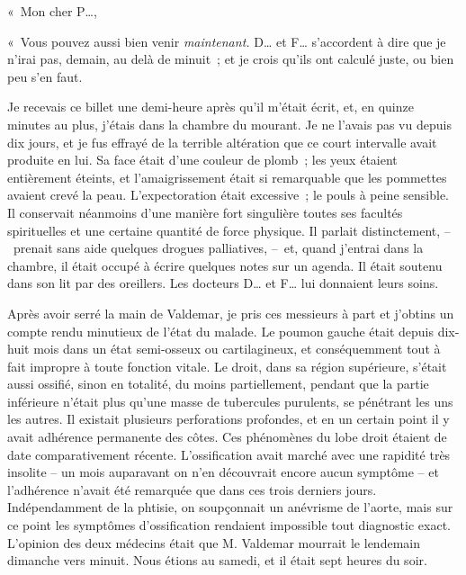 \documentclass[french,twoside]{book} %
\newcommand{\signed}[1]{\bigbreak\filbreak{\raggedleft #1\par}\medskip}
\newenvironment{quoteblock}%
  {\begin{quoting}}
  {\end{quoting}}
\newenvironment{quotebar}{%
    \def\FrameCommand{{\color{rubric!10!}\vrule width 0.5em} \hspace{0.9em}}%
    \def\OuterFrameSep{\itemsep} %
    \MakeFramed {\advance\hsize-\width \FrameRestore}
  }%
  {%
    \endMakeFramed
  }
\renewenvironment{quoteblock}%
  {%
    \savenotes
    \setstretch{0.9}
    \normalfont
    \begin{quotebar}
  }
  {%
    \end{quotebar}
    \spewnotes
  }
\begin{document}
\begin{quoteblock}
 \noindent « Mon cher P…,\par
 « Vous pouvez aussi bien venir \emph{maintenant.} D… et F… s’accordent à dire que je n’irai pas, demain, au delà de minuit ; et je crois qu’ils ont calculé juste, ou bien peu s’en faut.\par
 

\signed{« {\scshape Valdemar}. »}
 \end{quoteblock}

\noindent Je recevais ce billet une demi-heure après qu’il m’était écrit, et, en quinze minutes au plus, j’étais dans la chambre du mourant. Je ne l’avais pas vu depuis dix jours, et je fus effrayé de la terrible altération que ce court intervalle avait produite en lui. Sa face était d’une couleur de plomb ; les yeux étaient entièrement éteints, et l’amaigrissement était si remarquable que les pommettes avaient crevé la peau. L’expectoration était excessive ; le pouls à peine sensible. Il conservait néanmoins d’une manière fort singulière toutes ses facultés spirituelles et une certaine quantité de force physique. Il parlait distinctement, – prenait sans aide quelques drogues palliatives, – et, quand j’entrai dans la chambre, il était occupé à écrire quelques notes sur un agenda. Il était soutenu dans son lit par des oreillers. Les docteurs D… et F… lui donnaient leurs soins.\par
Après avoir serré la main de Valdemar, je pris ces messieurs à part et j’obtins un compte rendu minutieux de l’état du malade. Le poumon gauche était depuis dix-huit mois dans un état semi-osseux ou cartilagineux, et conséquemment tout à fait impropre à toute fonction vitale. Le droit, dans sa région supérieure, s’était aussi ossifié, sinon en totalité, du moins partiellement, pendant que la partie inférieure n’était plus qu’une masse de tubercules purulents, se pénétrant les uns les autres. Il existait plusieurs perforations profondes, et en un certain point il y avait adhérence permanente des côtes. Ces phénomènes du lobe droit étaient de date comparativement récente. L’ossification avait marché avec une rapidité très insolite – un mois auparavant on n’en découvrait encore aucun symptôme – et l’adhérence n’avait été remarquée que dans ces trois derniers jours. Indépendamment de la phtisie, on soupçonnait un anévrisme de l’aorte, mais sur ce point les symptômes d’ossification rendaient impossible tout diagnostic exact. L’opinion des deux médecins était que M. Valdemar mourrait le lendemain dimanche vers minuit. Nous étions au samedi, et il était sept heures du soir.\par
\end{document}
